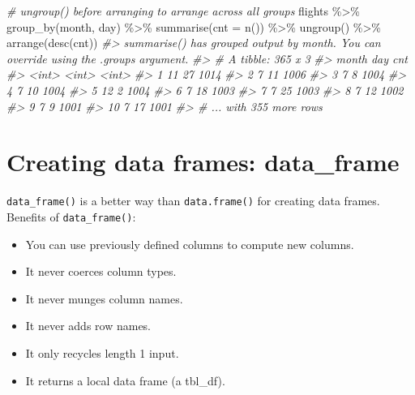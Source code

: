 \documentclass[
]{book}
\newenvironment{Shaded}{\begin{snugshade}}{\end{snugshade}}
\newcommand{\AttributeTok}[1]{\textcolor[rgb]{0.77,0.63,0.00}{#1}}
\newcommand{\CommentTok}[1]{\textcolor[rgb]{0.56,0.35,0.01}{\textit{#1}}}
\newcommand{\FunctionTok}[1]{\textcolor[rgb]{0.00,0.00,0.00}{#1}}
\newcommand{\NormalTok}[1]{#1}
\newcommand{\SpecialCharTok}[1]{\textcolor[rgb]{0.00,0.00,0.00}{#1}}
\providecommand{\tightlist}{%
  \setlength{\itemsep}{0pt}\setlength{\parskip}{0pt}}
\begin{document}
\begin{Shaded}
\begin{Highlighting}[]
\CommentTok{\# ungroup() before arranging to arrange across all groups}
\NormalTok{flights }\SpecialCharTok{\%\textgreater{}\%} \FunctionTok{group\_by}\NormalTok{(month, day) }\SpecialCharTok{\%\textgreater{}\%} \FunctionTok{summarise}\NormalTok{(}\AttributeTok{cnt =} \FunctionTok{n}\NormalTok{()) }\SpecialCharTok{\%\textgreater{}\%} \FunctionTok{ungroup}\NormalTok{() }\SpecialCharTok{\%\textgreater{}\%} \FunctionTok{arrange}\NormalTok{(}\FunctionTok{desc}\NormalTok{(cnt))}
\CommentTok{\#\textgreater{} \textasciigrave{}summarise()\textasciigrave{} has grouped output by \textquotesingle{}month\textquotesingle{}. You can override using the \textasciigrave{}.groups\textasciigrave{} argument.}
\CommentTok{\#\textgreater{} \# A tibble: 365 x 3}
\CommentTok{\#\textgreater{}    month   day   cnt}
\CommentTok{\#\textgreater{}    \textless{}int\textgreater{} \textless{}int\textgreater{} \textless{}int\textgreater{}}
\CommentTok{\#\textgreater{}  1    11    27  1014}
\CommentTok{\#\textgreater{}  2     7    11  1006}
\CommentTok{\#\textgreater{}  3     7     8  1004}
\CommentTok{\#\textgreater{}  4     7    10  1004}
\CommentTok{\#\textgreater{}  5    12     2  1004}
\CommentTok{\#\textgreater{}  6     7    18  1003}
\CommentTok{\#\textgreater{}  7     7    25  1003}
\CommentTok{\#\textgreater{}  8     7    12  1002}
\CommentTok{\#\textgreater{}  9     7     9  1001}
\CommentTok{\#\textgreater{} 10     7    17  1001}
\CommentTok{\#\textgreater{} \# ... with 355 more rows}
\end{Highlighting}
\end{Shaded}

\hypertarget{creating-data-frames-data_frame}{%
\chapter{Creating data frames: data\_frame}\label{creating-data-frames-data_frame}}

\texttt{data\_frame()} is a better way than \texttt{data.frame()} for creating data frames. Benefits of \texttt{data\_frame()}:

\begin{itemize}
\tightlist
\item
  You can use previously defined columns to compute new columns.
\item
  It never coerces column types.
\item
  It never munges column names.
\item
  It never adds row names.
\item
  It only recycles length 1 input.
\item
  It returns a local data frame (a tbl\_df).
\end{itemize}
\end{document}
